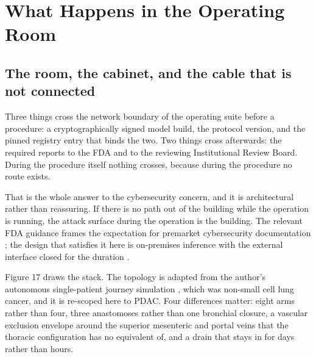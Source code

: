 \section{What Happens in the Operating Room}

\subsection{The room, the cabinet, and the cable that is not connected}

Three things cross the network boundary of the operating suite before a
procedure: a cryptographically signed model build, the protocol version, and the
pinned registry entry that binds the two. Two things cross afterwards: the
required reports to the FDA and to the reviewing Institutional Review Board.
During the procedure itself nothing crosses, because during the procedure no
route exists.

That is the whole answer to the cybersecurity concern, and it is architectural
rather than reassuring. If there is no path out of the building while the
operation is running, the attack surface during the operation is the building.
The relevant FDA guidance frames the expectation for premarket cybersecurity
documentation \cite{FDACyber2026}; the design that satisfies it here is
on-premises inference with the external interface closed for the duration
\cite{onpremwhippl}.

Figure 17 draws the stack. The topology is adapted from the author's autonomous
single-patient journey simulation \cite{paipatientjr}, which was non-small cell
lung cancer, and it is re-scoped here to PDAC. Four differences matter: eight
arms rather than four, three anastomoses rather than one bronchial closure, a
vascular exclusion envelope around the superior mesenteric and portal veins that
the thoracic configuration has no equivalent of, and a drain that stays in for
days rather than hours.

